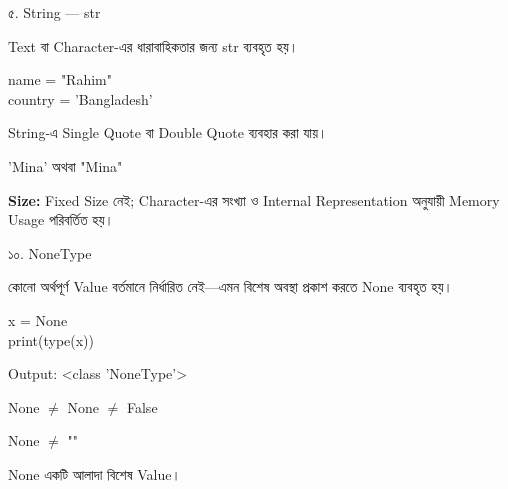 

\noindent
\begin{minipage}[t]{0.49\linewidth}

\begin{examplebox}{৫. String — \textenglish{\ttfamily str}}

Text বা Character-এর ধারাবাহিকতার জন্য
\textenglish{\ttfamily str}
ব্যবহৃত হয়।

\begin{codebox}
\begin{english}
\ttfamily
name = "Rahim"\\
country = 'Bangladesh'
\end{english}
\end{codebox}

String-এ Single Quote বা Double Quote ব্যবহার করা যায়।

\begin{center}
\textenglish{\ttfamily 'Mina'}
\qquad অথবা \qquad
\textenglish{\ttfamily "Mina"}
\end{center}

\textbf{Size:}
Fixed Size নেই; Character-এর সংখ্যা ও Internal Representation
অনুযায়ী Memory Usage পরিবর্তিত হয়।

\end{examplebox}

\end{minipage}
\hfill
\begin{minipage}[t]{0.49\linewidth}

\begin{examplebox}{১০. NoneType}

কোনো অর্থপূর্ণ Value বর্তমানে নির্ধারিত নেই—এমন বিশেষ অবস্থা
প্রকাশ করতে
\textenglish{\ttfamily None}
ব্যবহৃত হয়।

\begin{codebox}
\begin{english}
\ttfamily
x = None\\
print(type(x))
\end{english}
\end{codebox}

Output:
\textenglish{\ttfamily \textless class 'NoneType'\textgreater}

\medskip

\begin{center}
\textenglish{\ttfamily None}
\(\neq\)
\textenglish{}
\qquad
\textenglish{\ttfamily None}
\(\neq\)
\textenglish{\ttfamily False}

\medskip

\textenglish{\ttfamily None}
\(\neq\)
\textenglish{\ttfamily ""}
\end{center}

\textenglish{\ttfamily None}
একটি আলাদা বিশেষ Value।

\end{examplebox}

\end{minipage}

